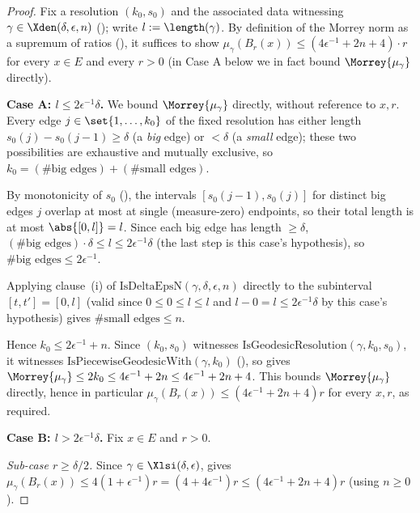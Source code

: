 \begin{proof}
  Fix a resolution $(k_0,s_0)$ and the associated data witnessing $\gamma \in
  \Xden(\delta,\epsilon,n)$ (); write $l := \length(\gamma)$. By definition of
  the Morrey norm as a supremum of ratios (), it suffices to show
  $\mu_\gamma(B_r(x)) \leq (4\epsilon^{-1}+2n+4) \cdot r$ for every $x \in E$ and every $r > 0$ (in
  Case A below we in fact bound $\Morrey{\mu_\gamma}$ directly).

  \textbf{Case A: $l \leq 2\epsilon^{-1}\delta$.} We bound $\Morrey{\mu_\gamma}$ directly, without
  reference to $x,r$. Every edge $j \in \set{1,\dotsc,k_0}$ of the fixed resolution has either
  length $s_0(j)-s_0(j-1) \geq \delta$ (a \emph{big} edge) or $< \delta$ (a \emph{small} edge); these
  two possibilities are exhaustive and mutually exclusive, so $k_0 = (\#\text{big edges}) +
  (\#\text{small edges})$.

  By monotonicity of $s_0$ (), the intervals $[s_0(j-1),s_0(j)]$ for
  distinct big edges $j$ overlap at most at single (measure-zero) endpoints, so their total length
  is at most $\abs{[0,l]} = l$. Since each big edge has length $\geq \delta$,
  $(\#\text{big edges}) \cdot \delta \leq l \leq 2\epsilon^{-1}\delta$ (the last step is this
  case's hypothesis), so $\#\text{big edges} \leq 2\epsilon^{-1}$.

  Applying clause~(i) of $\mathrm{IsDeltaEpsN}(\gamma,\delta,\epsilon,n)$ directly to the
  subinterval $[t,t']=[0,l]$ (valid since $0 \leq 0 \leq l \leq l$ and $l - 0 = l \leq
  2\epsilon^{-1}\delta$ by this case's hypothesis) gives $\#\text{small edges} \leq n$.

  Hence $k_0 \leq 2\epsilon^{-1} + n$. Since $(k_0,s_0)$ witnesses
  $\mathrm{IsGeodesicResolution}(\gamma,k_0,s_0)$, it witnesses
  $\mathrm{IsPiecewiseGeodesicWith}(\gamma,k_0)$ (), so
   gives $\Morrey{\mu_\gamma}
  \leq 2k_0 \leq 4\epsilon^{-1}+2n \leq 4\epsilon^{-1}+2n+4$. This bounds $\Morrey{\mu_\gamma}$
  directly, hence in particular $\mu_\gamma(B_r(x)) \leq (4\epsilon^{-1}+2n+4)r$ for every $x,r$, as
  required.

  \textbf{Case B: $l > 2\epsilon^{-1}\delta$.} Fix $x \in E$ and $r > 0$.

  \emph{Sub-case $r \geq \delta/2$.} Since $\gamma \in \Xlsi(\delta,\epsilon)$,
   gives $\mu_\gamma(B_r(x)) \leq 4(1+\epsilon^{-1})r = (4+4\epsilon^{-1})r
  \leq (4\epsilon^{-1}+2n+4) r$ (using $n \geq 0$).


\end{proof}
